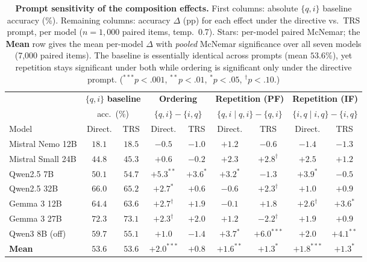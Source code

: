 \begin{table}[t]
\centering
\footnotesize
\setlength{\tabcolsep}{5pt}
\caption{\textbf{Prompt sensitivity of the composition effects.} First columns:
absolute $\{q,i\}$ baseline accuracy (\%). Remaining columns: accuracy $\Delta$
(pp) for each effect under the directive vs.\ TRS prompt, per model
($n=1{,}000$ paired items, temp.\ 0.7). Stars: per-model paired McNemar; the
\textbf{Mean} row gives the mean per-model $\Delta$ with \emph{pooled} McNemar
significance over all seven models (7{,}000 paired items). The baseline is
essentially identical across prompts (mean $53.6\%$), yet repetition stays
significant under both while ordering is significant only under the directive
prompt. ($^{***}p<.001$, $^{**}p<.01$, $^{*}p<.05$, $^{\dagger}p<.10$.)}
\label{tab:promptsens}
\begin{tabular}{l cc cc cc cc}
\toprule
 & \multicolumn{2}{c}{$\{q,i\}$ \textbf{baseline}}
 & \multicolumn{2}{c}{\textbf{Ordering}}
 & \multicolumn{2}{c}{\textbf{Repetition (PF)}}
 & \multicolumn{2}{c}{\textbf{Repetition (IF)}} \\
 & \multicolumn{2}{c}{acc.\ (\%)}
 & \multicolumn{2}{c}{$\{q,i\}-\{i,q\}$}
 & \multicolumn{2}{c}{$\{q,i{\mid}q,i\}-\{q,i\}$}
 & \multicolumn{2}{c}{$\{i,q{\mid}i,q\}-\{i,q\}$} \\
\cmidrule(lr){2-3}\cmidrule(lr){4-5}\cmidrule(lr){6-7}\cmidrule(lr){8-9}
Model & Direct. & TRS & Direct. & TRS & Direct. & TRS & Direct. & TRS \\
\midrule
Mistral Nemo 12B  & $18.1$ & $18.5$ & $-0.5$          & $-1.0$          & $+1.2$          & $-0.6$          & $-1.4$          & $-1.3$          \\
Mistral Small 24B & $44.8$ & $45.3$ & $+0.6$          & $-0.2$          & $+2.3$          & $+2.8^{\dagger}$& $+2.5$          & $+1.2$          \\
Qwen2.5 7B        & $50.1$ & $54.7$ & $+5.3^{**}$     & $+3.6^{*}$      & $+3.2^{*}$      & $-1.3$          & $+3.9^{*}$      & $-0.5$          \\
Qwen2.5 32B       & $66.0$ & $65.2$ & $+2.7^{*}$      & $+0.6$          & $-0.6$          & $+2.3^{\dagger}$& $+1.0$          & $+0.9$          \\
Gemma 3 12B       & $64.4$ & $63.6$ & $+2.7^{\dagger}$& $+1.9$          & $-0.1$          & $+1.8$          & $+2.6^{\dagger}$& $+3.6^{*}$      \\
Gemma 3 27B       & $72.3$ & $73.1$ & $+2.3^{\dagger}$& $+2.0$          & $+1.2$          & $-2.2^{\dagger}$& $+1.9$          & $+0.9$          \\
Qwen3 8B (off)    & $59.7$ & $55.1$ & $+1.0$          & $-1.4$          & $+3.7^{*}$      & $+6.0^{***}$    & $+2.0$          & $+4.1^{**}$     \\
\midrule
\textbf{Mean}     & $53.6$ & $53.6$ & $+2.0^{***}$    & $+0.8$          & $+1.6^{**}$     & $+1.3^{*}$      & $+1.8^{***}$    & $+1.3^{*}$      \\
\bottomrule
\end{tabular}
\end{table}
